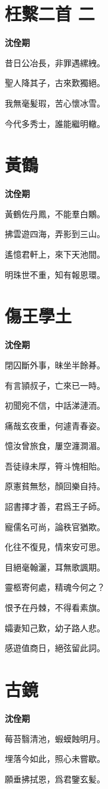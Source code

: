 \documentclass[12pt,a4paper]{ctexbook}
\begin{document}
\section{枉繫二首 二}
\textbf{沈佺期}\par\vspace{0.5em}
昔日公冶長，非罪遇縲絏。\par
聖人降其子，古來歎獨絕。\par
我無毫髪瑕，苦心懷冰雪。\par
今代多秀士，誰能繼明轍。\par

\section{黃鶴}
\textbf{沈佺期}\par\vspace{0.5em}
黃鶴佐丹鳳，不能羣白鷴。\par
拂雲遊四海，弄影到三山。\par
遙憶君軒上，來下天池間。\par
明珠世不重，知有報恩環。\par

\section{傷王學土}
\textbf{沈佺期}\par\vspace{0.5em}
閉囚斷外事，昧坐半餘朞。\par
有言頴叔子，亡來已一時。\par
初聞宛不信，中話涕漣洏。\par
痛哉玄夜重，何遽青春姿。\par
憶汝曾旅食，屢空瀍澗湄。\par
吾徒祿未厚，筲斗愧相貽。\par
原憲貧無愁，顏回樂自持。\par
詔書擇才善，君爲王子師。\par
寵儒名可尚，論秩官猶欺。\par
化往不復見，情來安可思。\par
目絕毫翰灑，耳無歌諷期。\par
靈柩寄何處，精魂今何之？\par
恨予在丹棘，不得看素旗。\par
孀妻知己歎，幼子路人悲。\par
感遊值商日，絕弦留此詞。\par

\section{古鏡}
\textbf{沈佺期}\par\vspace{0.5em}
莓苔翳清池，蝦蟆蝕明月。\par
埋落今如此，照心未嘗歇。\par
願垂拂拭恩，爲君鑒玄髪。\par
\end{document}
